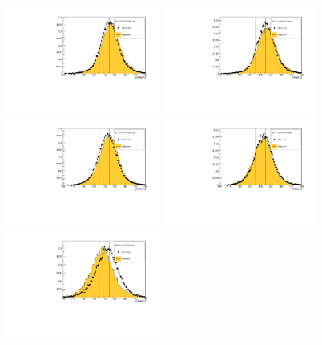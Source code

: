 \begin{figure}[!tbh]
    \centering
    \includegraphics*[width=0.45\textwidth]{02-Cuts/Figures/2017-2.7_3-140_lH2_full/tku_p_us_cut.pdf}
    \includegraphics*[width=0.45\textwidth]{02-Cuts/Figures/2017-2.7_3-140_lH2_empty/tku_p_us_cut.pdf}
    \includegraphics*[width=0.45\textwidth]{02-Cuts/Figures/2017-2.7_6-140_lH2_full/tku_p_us_cut.pdf}
    \includegraphics*[width=0.45\textwidth]{02-Cuts/Figures/2017-2.7_6-140_lH2_empty/tku_p_us_cut.pdf}
    \includegraphics*[width=0.45\textwidth]{02-Cuts/Figures/2017-2.7_10-140_lH2_full/tku_p_us_cut.pdf}

\end{figure}
